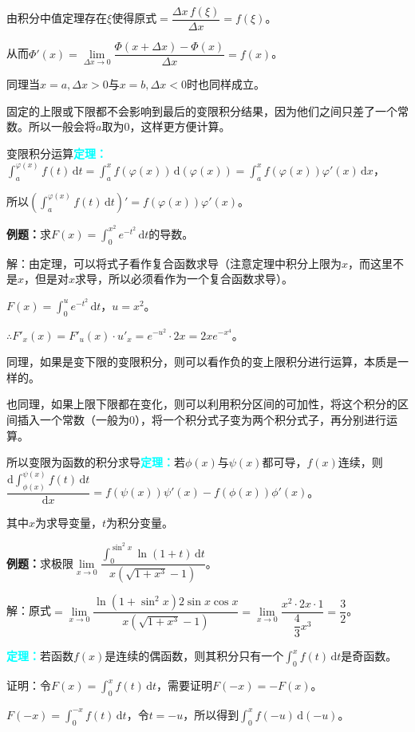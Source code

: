 \documentclass[UTF8, 12pt]{ctexart}
\begin{document}
由积分中值定理存在$\xi$使得原式$=\dfrac{\Delta x\,f(\xi)}{\Delta x}=f(\xi)$。

从而$\Phi'(x)=\lim\limits_{\Delta x\to 0}\dfrac{\Phi(x+\Delta x)-\Phi(x)}{\Delta x}=f(x)$。

同理当$x=a,\Delta x>0$与$x=b,\Delta x<0$时也同样成立。

固定的上限或下限都不会影响到最后的变限积分结果，因为他们之间只差了一个常数。所以一般会将$a$取为0，这样更方便计算。

变限积分运算\textcolor{aqua}{\textbf{定理：}}$\int_a^{\varphi(x)}f(t)\,\textrm{d}t=\int_a^xf(\varphi(x))\,\textrm{d}(\varphi(x))=\int_a^xf(\varphi(x))\varphi'(x)\,\textrm{d}x$，

所以$(\int_a^{\varphi(x)}f(t)\,\textrm{d}t)'=f(\varphi(x))\varphi'(x)$。

\textbf{例题：}求$F(x)=\int_0^{x^2}e^{-t^2}\,\textrm{d}t$的导数。

解：由定理，可以将式子看作复合函数求导（注意定理中积分上限为$x$，而这里不是$x$，但是对$x$求导，所以必须看作为一个复合函数求导）。

$F(x)=\int_0^ue^{-t^2}\,\textrm{d}t$，$u=x^2$。

$\therefore F'_x(x)=F'_u(x)\cdot u'_x=e^{-u^2}\cdot 2x=2xe^{-x^4}$。

同理，如果是变下限的变限积分，则可以看作负的变上限积分进行运算，本质是一样的。

也同理，如果上限下限都在变化，则可以利用积分区间的可加性，将这个积分的区间插入一个常数（一般为0），将一个积分式子变为两个积分式子，再分别进行运算。

所以变限为函数的积分求导\textcolor{aqua}{\textbf{定理：}}若$\phi(x)$与$\psi(x)$都可导，$f(x)$连续，则$\dfrac{\textrm{d}\int_{\phi(x)}^{\psi(x)}f(t)\,\textrm{d}t}{\textrm{d}x}=f(\psi(x))\psi'(x)-f(\phi(x))\phi'(x)$。

其中$x$为求导变量，$t$为积分变量。

\textbf{例题：}求极限$\lim\limits_{x\to 0}\dfrac{\int_0^{\sin^2x}\ln(1+t)\,\textrm{d}t}{x(\sqrt{1+x^3}-1)}$。

解：原式$=\lim\limits_{x\to 0}\dfrac{\ln(1+\sin^2x)2\sin x\cos x}{x(\sqrt{1+x^3}-1)}=\lim\limits_{x\to 0}\dfrac{x^2\cdot 2x\cdot 1}{\dfrac{4}{3}x^3}=\dfrac{3}{2}$。\smallskip

\textcolor{aqua}{\textbf{定理：}}若函数$f(x)$是连续的偶函数，则其积分只有一个$\int^x_0f(t)\,\textrm{d}t$是奇函数。

证明：令$F(x)=\int_0^xf(t)\,\textrm{d}t$，需要证明$F(-x)=-F(x)$。

$F(-x)=\int_0^{-x}f(t)\,\textrm{d}t$，令$t=-u$，所以得到$\int_0^xf(-u)\,\textrm{d}(-u)$。
\end{document}
